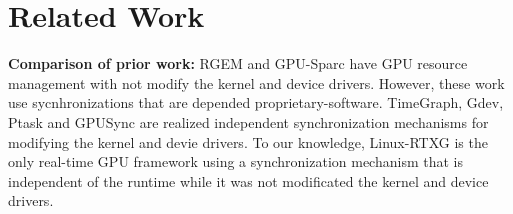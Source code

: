 \section{Related Work}\label{sec:relatedwork}
\textbf{Comparison of prior work:}
RGEM and GPU-Sparc\cite{sparc} have GPU resource management with not modify the kernel and device drivers.
However, these work use sycnhronizations that are depended proprietary-software.
TimeGraph, Gdev, Ptask and GPUSync are realized independent synchronization mechanisms for modifying the kernel and devie drivers.
To our knowledge, Linux-RTXG is the only real-time GPU framework using a synchronization mechanism that is independent of the runtime while it was not modificated the kernel and device drivers.


%
%

